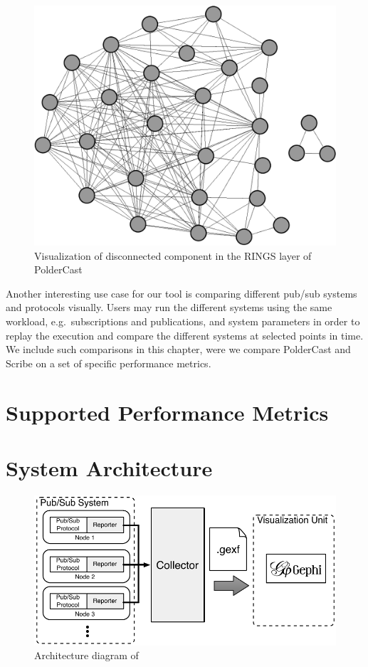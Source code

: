 \begin{figure}[h]
\includegraphics[width=\linewidth]{figures/disconnected-component-poldercast.pdf}
\caption{Visualization of disconnected component in the RINGS layer of PolderCast}
\label{fig:pold_disc}
\end{figure}

Another interesting use case for our tool is comparing different pub/sub systems and
protocols visually. Users may run the different systems using the same
workload, e.g.\ subscriptions and publications, and system parameters in
order to replay the execution and compare the different systems at
selected points in time. We include such comparisons in this chapter,
were we compare PolderCast and Scribe on a set of specific performance
metrics.

\section{Supported Performance Metrics}
\label{sec:metrics}



\section{System Architecture}

\begin{figure}[h]
\centering
\includegraphics[width=\linewidth]{figures/arch}
\caption{Architecture diagram of \demo}
\label{fig:arch}
\end{figure}

